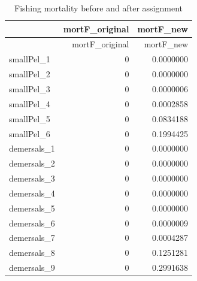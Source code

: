 \documentclass[
]{article}
\begin{document}
\begin{longtable}[]{@{}lrr@{}}
\caption{Fishing mortality before and after assignment}\tabularnewline
\toprule\noalign{}
& mortF\_original & mortF\_new \\
\midrule\noalign{}
\endfirsthead
\toprule\noalign{}
& mortF\_original & mortF\_new \\
\midrule\noalign{}
\endhead
\bottomrule\noalign{}
\endlastfoot
smallPel\_1 & 0 & 0.0000000 \\
smallPel\_2 & 0 & 0.0000000 \\
smallPel\_3 & 0 & 0.0000006 \\
smallPel\_4 & 0 & 0.0002858 \\
smallPel\_5 & 0 & 0.0834188 \\
smallPel\_6 & 0 & 0.1994425 \\
demersals\_1 & 0 & 0.0000000 \\
demersals\_2 & 0 & 0.0000000 \\
demersals\_3 & 0 & 0.0000000 \\
demersals\_4 & 0 & 0.0000000 \\
demersals\_5 & 0 & 0.0000000 \\
demersals\_6 & 0 & 0.0000009 \\
demersals\_7 & 0 & 0.0004287 \\
demersals\_8 & 0 & 0.1251281 \\
demersals\_9 & 0 & 0.2991638 \\
\end{longtable}
\end{document}
